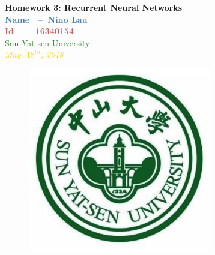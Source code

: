 \documentclass[12pt]{article}
\begin{document}
 
 
\title{}
\begin{center}
\LARGE\textbf{Homework 3: Recurrent Neural Networks\\}
\vspace{3cm}
\large  \textcolor{steelblue}{\textbf{Name $\ $ -- $\ $Nino Lau}}\\
\vspace{2mm}
\large \textcolor{indianred}{\textbf{Id $\ $ -- $\ $ 16340154}} \\
\vspace{2mm}
\normalsize \textcolor{forestgreen}{Sun Yat-sen University\\}
\vspace{9mm}
\normalsize \textcolor{gold}{\textit{May. $18^{th}$, 2018}\\}
\end{center}
\vspace{2,7cm}
\begin{figure}[h]
\centering
\includegraphics[width=8cm,height=8cm]{sysu.png}
\end{figure}
\clearpage
\end{document}
